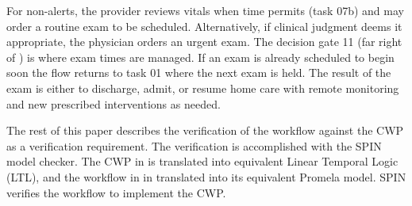 For non-alerts, the provider reviews vitals when time permits (task 07b) and may order a routine exam to be scheduled. Alternatively, if clinical judgment deems it appropriate, the physician orders an urgent exam.
The decision gate 11 (far right of ) is where exam times are managed. If an exam is already scheduled to begin soon the flow returns to task 01 where the next exam is held. The result of the exam is either to discharge, admit, or resume home care with remote monitoring and new prescribed interventions as needed.

The rest of this paper describes the verification of the workflow against the CWP as a verification requirement. The verification is accomplished with the SPIN model checker. The CWP in  is translated into equivalent Linear Temporal Logic (LTL), and the workflow in  in translated into its equivalent Promela model. SPIN verifies the workflow to implement the CWP.
